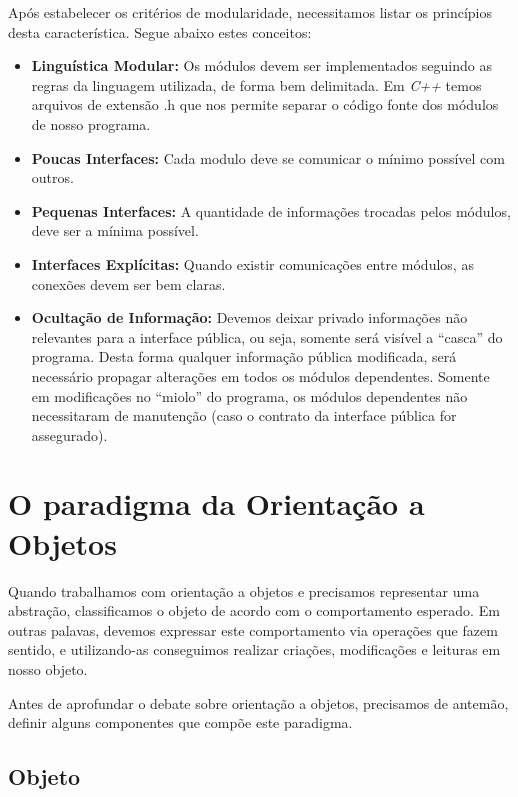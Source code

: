 \documentclass[a4paper, 12pt]{article}
\begin{document}
		Após estabelecer os critérios de modularidade, necessitamos listar os princípios desta característica. Segue abaixo estes conceitos:
		
		\begin{itemize}
			\item \textbf{Linguística Modular:} Os módulos devem ser implementados seguindo as regras da linguagem utilizada, de forma bem delimitada. Em  \textit{C++} temos arquivos de extensão .h que nos permite separar o código fonte dos módulos de nosso programa.
			
			\item \textbf{Poucas Interfaces:} Cada modulo deve se comunicar o mínimo possível com outros.
			
			\item \textbf{Pequenas Interfaces:} A quantidade de informações trocadas pelos módulos, deve ser a mínima possível.
			
			\item \textbf{Interfaces Explícitas:} Quando existir comunicações entre módulos, as conexões devem ser bem claras.
			
			\item \textbf{Ocultação de Informação:} Devemos deixar privado informações não relevantes para a interface pública, ou seja, somente será visível a ``casca'' do programa. Desta forma qualquer informação pública modificada, será necessário propagar alterações em todos os módulos dependentes. Somente em modificações no ``miolo'' do programa, os módulos dependentes não necessitaram de manutenção (caso o contrato da interface pública for assegurado).
		\end{itemize}
	
	\section{O paradigma da Orientação a Objetos}
		
		Quando trabalhamos com orientação a objetos e precisamos representar uma abstração, classificamos o objeto de acordo com o comportamento esperado. Em outras palavas, devemos expressar este comportamento via operações que fazem sentido, e utilizando-as conseguimos realizar criações, modificações e leituras em nosso objeto.
		
		Antes de aprofundar o debate sobre orientação a objetos, precisamos de antemão, definir alguns componentes que compõe este paradigma.
		
		\subsection{Objeto}
		
\end{document}
